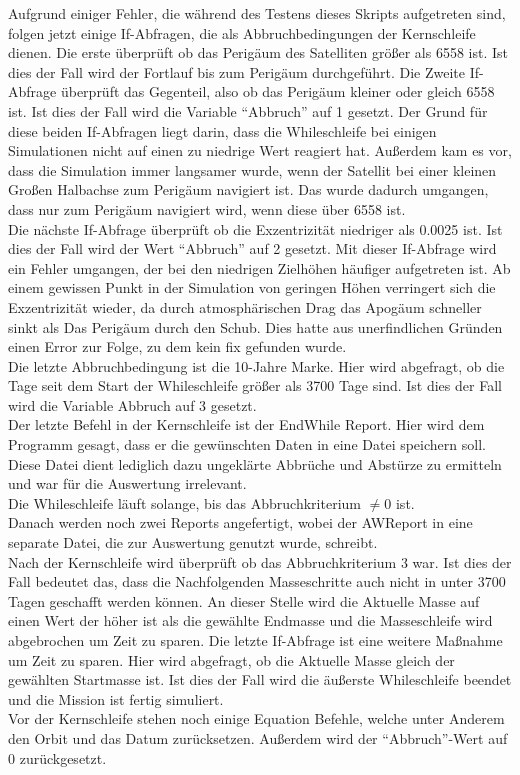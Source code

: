 Aufgrund einiger Fehler, die während des Testens dieses Skripts aufgetreten sind, folgen jetzt einige If-Abfragen, die als Abbruchbedingungen der Kernschleife dienen.
Die erste überprüft ob das Perigäum des Satelliten größer als \num{6558} ist. Ist dies der Fall wird der Fortlauf bis zum Perigäum durchgeführt. Die Zweite If-Abfrage überprüft das Gegenteil, also ob das Perigäum kleiner oder gleich \num{6558} ist. Ist dies der Fall wird die Variable “Abbruch” auf \num{1} gesetzt. Der Grund für diese beiden If-Abfragen liegt darin, dass die Whileschleife bei einigen Simulationen nicht auf einen zu niedrige Wert reagiert hat. Außerdem kam es vor, dass die Simulation immer langsamer wurde, wenn der Satellit bei einer kleinen Großen Halbachse zum Perigäum navigiert ist. Das wurde dadurch umgangen, dass nur zum Perigäum navigiert wird, wenn diese über \num{6558} ist. \\
Die nächste If-Abfrage überprüft ob die Exzentrizität niedriger als \num{0.0025} ist. Ist dies der Fall wird der Wert “Abbruch” auf \num{2} gesetzt. Mit dieser If-Abfrage wird ein Fehler umgangen, der bei den niedrigen Zielhöhen häufiger aufgetreten ist. Ab einem gewissen Punkt in der Simulation von geringen Höhen verringert sich die Exzentrizität wieder, da durch atmosphärischen Drag das Apogäum schneller sinkt als Das Perigäum durch den Schub. Dies hatte aus unerfindlichen Gründen einen Error zur Folge, zu dem kein fix gefunden wurde. \\
Die letzte Abbruchbedingung ist die \num{10}-Jahre Marke. Hier wird abgefragt, ob die Tage seit dem Start der Whileschleife größer als \num{3700} Tage sind. Ist dies der Fall wird die Variable Abbruch auf \num{3} gesetzt.\\
Der letzte Befehl in der Kernschleife ist der EndWhile Report. Hier wird dem Programm gesagt, dass er die gewünschten Daten in eine Datei speichern soll. Diese Datei dient lediglich dazu ungeklärte Abbrüche und Abstürze zu ermitteln und war für die Auswertung irrelevant.\\
Die Whileschleife läuft solange, bis das Abbruchkriterium $\neq 0$ ist.\\
Danach werden noch zwei Reports angefertigt, wobei der AWReport in eine separate Datei, die zur Auswertung genutzt wurde, schreibt.\\
Nach der Kernschleife wird überprüft ob das Abbruchkriterium \num{3} war. Ist dies der Fall bedeutet das, dass die Nachfolgenden Masseschritte auch nicht in unter \num{3700} Tagen geschafft werden können. An dieser Stelle wird die Aktuelle Masse auf einen Wert der höher ist als die gewählte Endmasse und die Masseschleife wird abgebrochen um Zeit zu sparen. Die letzte If-Abfrage ist eine weitere Maßnahme um Zeit zu sparen. Hier wird abgefragt, ob die Aktuelle Masse gleich der gewählten Startmasse ist. Ist dies der Fall wird die äußerste Whileschleife beendet und die Mission ist fertig simuliert.\\
Vor der Kernschleife stehen noch einige Equation Befehle, welche unter Anderem den Orbit und das Datum zurücksetzen. Außerdem wird der “Abbruch”-Wert auf \num{0} zurückgesetzt.



